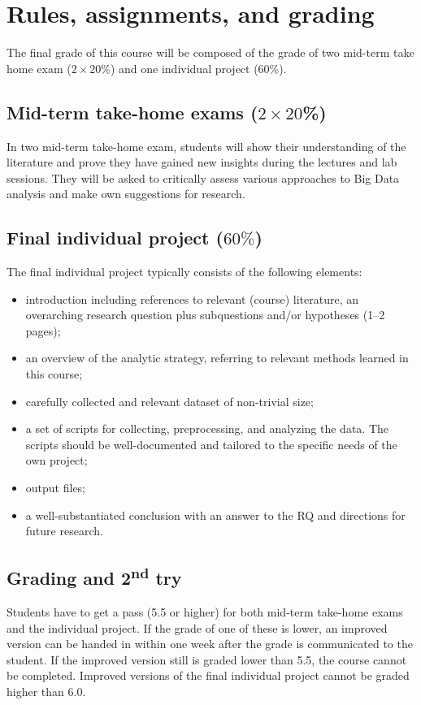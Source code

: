 \documentclass[a4paper,10pt]{report}
\begin{document}
	
	\chapter{Rules, assignments, and grading}
	The final grade of this course will be composed of the grade of two mid-term take home exam ($2 \times 20$\%) and one individual project (60\%).
	
	\section{Mid-term take-home exams ($2 \times 20$\%)}
	In two mid-term take-home exam, students will show their understanding of the literature and prove they have gained new insights during the lectures and lab sessions. They will be asked to critically assess various approaches to Big Data analysis and make own suggestions for research.
	
	\section{Final individual project ($60\%$)}
	The final individual project typically consists of the following elements:
	\begin{itemize}
		\item introduction including references to relevant (course) literature, an overarching research question plus subquestions and/or hypotheses (1–2 pages);
		\item an overview of the analytic strategy, referring to relevant methods learned in this course;
		\item carefully collected and relevant dataset of non-trivial size;
		\item a set of scripts for collecting, preprocessing, and analyzing the data. The scripts should be well-documented and tailored to the specific needs of the own project;
		\item output files;
		\item a well-substantiated conclusion with an answer to the RQ and directions for future research.
	\end{itemize}
	
	\section{Grading and 2\textsuperscript{nd} try}
	Students have to get a pass (5.5 or higher) for both mid-term take-home exams and the individual project. If the grade of one of these is lower, an improved version can be handed in within one week after the grade is communicated to the student. If the improved version still is graded lower than 5.5, the course cannot be completed. Improved versions of the final individual project cannot be graded higher than 6.0. 
	
\end{document}
